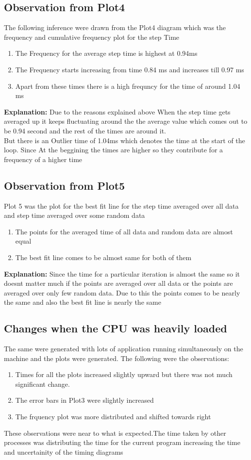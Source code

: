 \documentclass[11pt,]{article}
\begin{document}
\begin{singlespace}
\subsection{Observation from Plot4}
The following inference were drawn from the Plot4 diagram which was the frequency and cumulative frequency plot for the step Time
\begin{enumerate}
    \item The Frequency for the average step time is highest at 0.94ms
    \item The Frequency starts increasing from time 0.84 ms and increases till 0.97 ms 
    \item Apart from these times there is a high frequncy for the time of around 1.04 ms
\end{enumerate}
\textbf{Explanation:}
Due to the reasons explained above When the step time gets averaged up it keeps fluctuating around the the average value which comes out to be 
0.94 second and the rest of the times are around it.\\

But there is an Outlier time of 1.04ms which denotes the time at the start of the loop. Since  At the beggining the times are higher so they 
contribute for a frequency of a higher time

\subsection{Observation from Plot5}
Plot 5 was the plot for the best fit line for the step time averaged over all data and step time averaged over some random data
\begin{enumerate}
    \item The points for the averaged time of all data and random data are almost equal 
    \item The best fit line comes to be almost same for both of them
\end{enumerate}
\textbf{Explanation:}
	Since the time for a particular iteration is almost the same so it doesnt matter much if the points are averaged over all data or 
the  points are averaged over only few random data. Due to this the points comes to be nearly the same and also the best fit line is nearly 
the same
\subsection{Changes when the CPU was heavily loaded}
The same were generated with lots of application running simultaneously on the machine and the plots were generated. 
The following were the observations:
\begin{enumerate}
    \item Times for all the plots increased slightly upward but there was not much significant change. 
    \item The error bars in Plot3 were slightly increased
    \item The frquency plot was more distributed and shifted towards right
\end{enumerate}
These observations were near to what is expected.The time taken by other processes was distributing the time for the current program increasing
the time and uncertainity of the timing diagrams

\end{singlespace}
\end{document}
